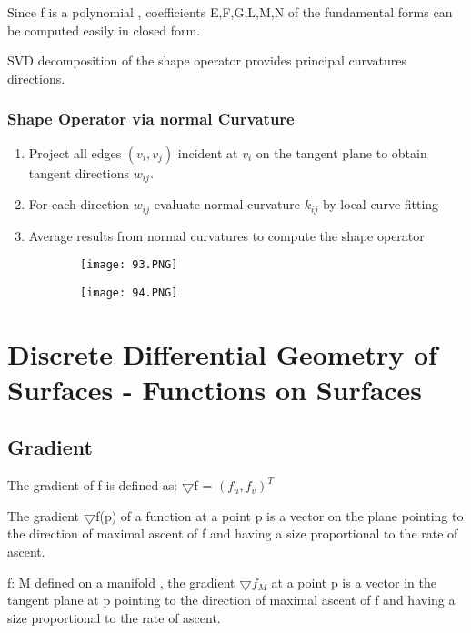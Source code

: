 \documentclass{article}
\begin{document}
Since f is a polynomial , coefficients E,F,G,L,M,N of the fundamental forms can be computed easily in closed form.

SVD decomposition of the shape operator provides principal curvatures directions.

\subsubsection{Shape Operator via normal Curvature}

\begin{enumerate}
    \item Project all edges $(v_i,v_j)$ incident at $v_i$ on the tangent plane to obtain tangent directions $w_{ij}$.
    \item For each direction $w_{ij}$ evaluate normal curvature $k_{ij}$ by local curve fitting
    \item Average results from normal curvatures to compute the shape operator
\end{enumerate}

\begin{figure}[ht!]
  \centering
  \begin{subfigure}[b]{0.49\linewidth}
    \texttt{[image: 93.PNG]}
  \end{subfigure}
     \begin{subfigure}[b]{0.49\textwidth}
         \centering
         \texttt{[image: 94.PNG]}
     \end{subfigure}
\end{figure}

\section{Discrete Differential Geometry of Surfaces - Functions on Surfaces}

\subsection{Gradient}

The gradient of f is defined as: $\bigtriangledown$f = $(f_u,f_v)^T$

The gradient $\bigtriangledown$f(p) of a function at a point p is a vector on the plane pointing to the direction of maximal ascent of f and having a size proportional to the rate of ascent.

f: M  defined on a manifold , the gradient $\bigtriangledown f_M$ at a point p is a vector in the tangent plane at p pointing to the direction of maximal ascent of f and having a size proportional to the rate of ascent.
\end{document}
